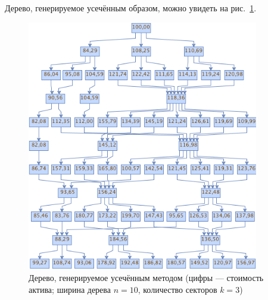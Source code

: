 \documentclass[specialist,
               substylefile = spbu.rtx,
               subf,href,colorlinks=true, 12pt]{disser}
\begin{document}
	Дерево, генерируемое усечённым образом, можно увидеть на рис.~\ref{fig:linearTree}. 
	\begin{figure}%
		\includegraphics[width=0.9\textwidth]{linear_tree}
		\caption{Дерево, генерируемое усечённым методом (цифры --- стоимость актива; ширина дерева $n=10$, количество секторов $k=3$)}
		\label{fig:linearTree}
	\end{figure}
\end{document}

